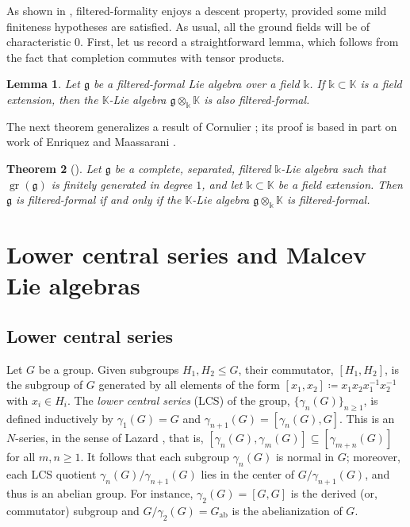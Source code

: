 \documentclass{article}
\numberwithin{equation}{section}
\newtheorem{theorem}{Theorem}[section]
\newtheorem{lemma}[theorem]{Lemma}
\theoremstyle{definition}
\newcommand{\K}{\mathbb{K}}
\renewcommand{\k}{\mathbb{k}}
\newcommand{\g}{{\mathfrak{g}}}
\DeclareMathOperator{\gr}{gr}
\DeclareMathOperator{\ab}{{ab}}
\begin{document}
As shown in \cite{SW-forum}, filtered-formality enjoys a descent 
property, provided some mild finiteness hypotheses are satisfied.  
As usual, all the ground fields will be of characteristic $0$. First, 
let us record a straightforward lemma, which follows from the 
fact that completion commutes with tensor products.

\begin{lemma}
\label{lem:ffascent}
Let $\g$ be a filtered-formal Lie algebra over a field $\k$.  
If\/ $\k\subset \K$ is a  field extension, then 
the $\K$-Lie algebra $\g \otimes_{\k} \K$ is also filtered-formal. 
\end{lemma}

The next theorem generalizes a result of Cornulier \cite{Cornulier14}; 
its proof is based in part on work of Enriquez \cite{Enriquez}  and 
Maassarani \cite{Maassarani}.

\begin{theorem}[\cite{SW-forum}]
\label{thm:ffdescent}
Let $\g$ be a complete, separated, filtered $\k$-Lie algebra 
such that $\gr(\g)$ is finitely generated in degree $1$, and let 
$\k\subset \K$ be a field extension. Then $\g$ 
is filtered-formal if and only if the $\K$-Lie algebra 
$\g \otimes_{\k} \K$ is  filtered-formal. 
\end{theorem}

\section{Lower central series and Malcev Lie algebras}
\label{sect:malcev-lie}

\subsection{Lower central series}
\label{subsec:lcs}

Let $G$ be a group. Given subgroups $H_1, H_2\le G$, 
their commutator, $[H_1,H_2]$, is the subgroup of $G$ generated by all 
elements of the form $[x_1,x_2]\coloneqq x_1^{}x_2^{}x_1^{-1}x_2^{-1}$ 
with $x_i\in H_i$. The {\em lower central series}\/ (LCS) of the group, 
$\{\gamma_n (G)\}_{n\ge 1}$, is defined inductively by $\gamma_1 (G)=G$ and 
$\gamma_{n+1} (G) = [\gamma_n(G), G]$. This is an $N$-series, in the 
sense of Lazard \cite{Lazard}, that is, $[\gamma_n(G), \gamma_m(G)]\subseteq 
[\gamma_{m+n}(G)]$ for all $m,n\ge 1$. It follows that each subgroup 
$\gamma_n(G)$ is normal in $G$; moreover, each LCS quotient 
$\gamma_n(G)/\gamma_{n+1}(G)$ lies in the center of 
$G/\gamma_{n+1}(G)$, and thus is an abelian group. 
For instance, $\gamma_2(G)=[G,G]$ is the derived (or, commutator) 
subgroup and $G/\gamma_2(G) = G_{\ab}$ is the abelianization of $G$.
\end{document}
